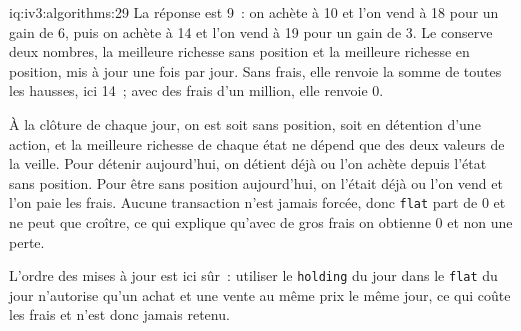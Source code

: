 \begin{solution}{iq:iv3:algorithms:29}
La réponse est 9~: on achète à 10 et l'on vend à 18 pour un gain de 6, puis on achète à 14 et l'on vend à 19 pour un gain de 3. Le  conserve deux nombres, la meilleure richesse sans position et la meilleure richesse en position, mis à jour une fois par jour. Sans frais, elle renvoie la somme de toutes les hausses, ici 14~; avec des frais d'un million, elle renvoie 0.
\enlargethispage{-3\baselineskip}%
\label{lst:iv3:al:tradefee}

À la clôture de chaque jour, on est soit sans position, soit en détention d'une action, et la meilleure richesse de chaque état ne dépend que des deux valeurs de la veille. Pour détenir aujourd'hui, on détient déjà ou l'on achète depuis l'état sans position. Pour être sans position aujourd'hui, on l'était déjà ou l'on vend et l'on paie les frais. Aucune transaction n'est jamais forcée, donc \texttt{flat} part de 0 et ne peut que croître, ce qui explique qu'avec de gros frais on obtienne 0 et non une perte.

L'ordre des mises à jour est ici sûr~: utiliser le \texttt{holding} du jour dans le \texttt{flat} du jour n'autorise qu'un achat et une vente au même prix le même jour, ce qui coûte les frais et n'est donc jamais retenu.

\end{solution}

